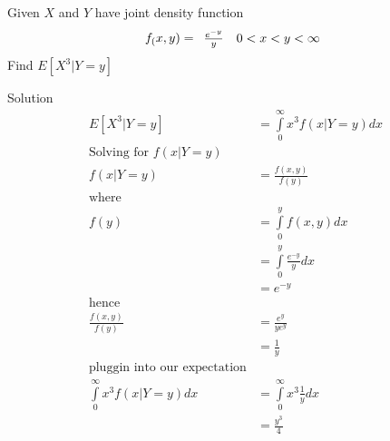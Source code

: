 \documentclass{article}
\begin{document}
\begin{spacing}{1.1}
\newpage
\begin{homeworkProblem}
  Given $X$ and $Y$ have joint density function
  \[
    f_( x, y) = \begin{array}{l l}
      \frac{ e^{-y}}{ y} & 0 < x < y < \infty\\
    \end{array}
  \]
  Find $E[ X^3|Y = y]$
  \begin{homeworkSection}{Solution}
    \begin{align*}
      E[ X^3|Y = y]
        &= \int\limits_0^\infty x^3 f(x | Y = y) dx\\
      \text{Solving for $f(x | Y = y)$}\\
      f(x | Y = y) 
        &= \frac{ f( x, y)}{ f( y)}\\
        \text{where}\\
        f( y) &= \int\limits_0^y f( x, y) dx\\
        &= \int\limits_0^y \frac{ e^{-y}}{ y} dx\\
        &= e^{-y}\\
        \text{hence}\\
      \frac{ f( x, y)}{ f( y)}
        &= \frac{ e^{y}}{ y e^{y}}\\
        &= \frac{ 1}{ y}\\
      \text{pluggin into our expectation}\\
      \int\limits_0^\infty x^3 f(x | Y = y) dx
      &= \int\limits_0^\infty x^3 \frac{ 1}{ y} dx\\
      &= \frac{ y^3}{ 4}
    \end{align*}
  \end{homeworkSection}
\end{homeworkProblem}
  
\end{spacing}
\end{document}
